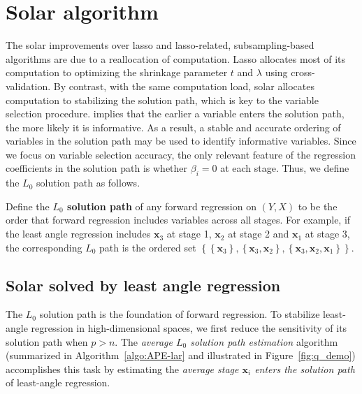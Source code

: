 \documentclass[12pt]{article}
\begin{document}

\section{Solar algorithm \label{section:algo}}

The solar improvements over lasso and lasso-related, subsampling-based algorithms are due to a reallocation of computation. Lasso allocates most of its computation to optimizing the shrinkage parameter $t$ and $\lambda$ using cross-validation. By contrast, with the same computation load, solar allocates computation to stabilizing the solution path, which is key to the variable selection procedure. \citet[Theorem~2]{zhang09} implies that the earlier a variable enters the solution path, the more likely it is informative. As a result, a stable and accurate ordering of variables in the solution path may be used to identify informative variables. Since we focus on variable selection accuracy, the only relevant feature of the regression coefficients in the solution path is whether $\beta_i = 0$ at each stage. Thus, we define the $L_0$ solution path as follows.
%
\begin{definition}
  Define the \textbf{$L_0$ solution path} of any forward regression on $\left( Y, X \right)$ to be the order that forward regression includes variables across all stages. For example, if the least angle regression includes $\mathbf{x}_3$ at stage 1, $\mathbf{x}_2$ at stage 2 and $\mathbf{x}_1$ at stage 3, the corresponding $L_0$ path is the ordered set $\left\{ \left\{\mathbf{x}_3 \right\}, \left\{ \mathbf{x}_3, \mathbf{x}_2 \right\}, \left\{ \mathbf{x}_3, \mathbf{x}_2, \mathbf{x}_1 \right\} \right\}$.
  \label{def:solution_path}
\end{definition}

\subsection{Solar solved by least angle regression}

The $L_0$ solution path is the foundation of forward regression. To stabilize least-angle regression in high-dimensional spaces, we first reduce the sensitivity of its solution path when $p > n$. The \emph{average $L_0$ solution path estimation} algorithm (summarized in Algorithm~\ref{algo:APE-lar} and illustrated in Figure~\ref{fig:q_demo}) accomplishes this task by estimating the \emph{average stage $\mathbf{x}_i$ enters the solution path} of least-angle regression.
\end{document}
